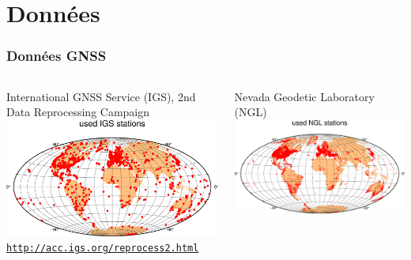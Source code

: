 \documentclass[9pt]{beamer}
\begin{document}
\section{Données}

\begin{frame}
    \frametitle{Données GNSS}
    \begin{columns}
        \begin{column}{0.5\textwidth}
        \centering
            International GNSS Service (IGS), 
            2nd Data Reprocessing Campaign\\
            \vspace{0.2cm}
            \includegraphics[width=\textwidth]{figures/sd_ig2.png}
            \hyperlink{http://acc.igs.org/reprocess2.html}{ \verb #http://acc.igs.org/reprocess2.html# }\\
        \end{column}
        \begin{column}{0.5\textwidth}
            \centering
            Nevada Geodetic Laboratory (NGL)\\
            \vspace{0.5cm}
            \includegraphics[width=\textwidth]{figures/sd_ngl.png}

\end{column}
\end{columns}
\end{frame}
\end{document}
